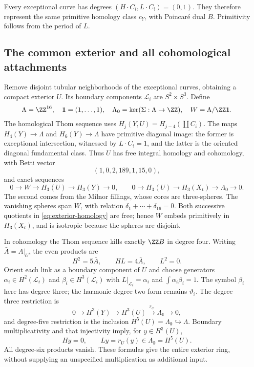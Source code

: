 Every exceptional curve has degrees $(H\cdot C_i,L\cdot C_i)=(0,1)$.
They therefore represent the same primitive homology class $c_Y$, with
Poincar\'e dual $B$. Primitivity follows from the period of $L$.

\subsection{The common exterior and all cohomological attachments}
Remove disjoint tubular neighborhoods of the exceptional curves, obtaining
a compact exterior $U$. Its boundary components $\mathcal L_i$ are
$S^2\times S^3$. Define
\[
 \Lambda=\ZZ^{16},\quad \mathbf1=(1,\ldots,1),\quad
 \Lambda_0=\ker(\Sigma:\Lambda\to\ZZ),\quad W=\Lambda/\ZZ\mathbf1.
\]
The homological Thom sequence uses
$H_j(Y,U)=H_{j-4}(\coprod C_i)$.
The maps $H_4(Y)\to\Lambda$ and $H_6(Y)\to\Lambda$ have primitive
diagonal image: the former is exceptional intersection, witnessed by
$L\cdot C_i=1$, and the latter is the oriented diagonal fundamental
class. Thus $U$ has free integral homology and cohomology, with Betti
vector
\begin{equation}\label{eq:exterior-betti}
 (1,0,2,189,1,15,0),
\end{equation}
and exact sequences
\begin{equation}\label{eq:exterior-homology}
 0\to W\to H_3(U)\to H_3(Y)\to0,
 \qquad 0\to H_3(U)\to H_3(X_t)\to \Lambda_0\to0.
\end{equation}
The second comes from the Milnor fillings, whose cores are three-spheres.
The vanishing spheres span $W$, with relation
$\delta_1+\cdots+\delta_{16}=0$. Both successive quotients in
\eqref{eq:exterior-homology} are free; hence $W$ embeds primitively in
$H_3(X_t)$, and is isotropic because the spheres are disjoint.

In cohomology the Thom sequence kills exactly $\ZZ B$ in degree four.
Writing $\bar A=A|_U$, the even products are
\[
 H^2=5\bar A,\qquad HL=4\bar A,\qquad L^2=0.
\]
Orient each link as a boundary component of $U$ and choose generators
$\alpha_i\in H^2(\mathcal L_i)$ and $\beta_i\in H^3(\mathcal L_i)$
with $L|_{\mathcal L_i}=\alpha_i$ and $\int\alpha_i\beta_i=1$.
The symbol $\beta_i$ here has degree three; the harmonic degree-two
form remains $\vartheta_i$. The degree-three restriction is
\begin{equation}\label{eq:exterior-cohomology}
 0\to H^3(Y)\to H^3(U)\xrightarrow{r_U}\Lambda_0\to0,
\end{equation}
and degree-five restriction is the inclusion $H^5(U)=\Lambda_0\hookrightarrow\Lambda$.
Boundary multiplicativity and that injectivity imply, for $y\in H^3(U)$,
\[
 Hy=0,\qquad Ly=r_U(y)\in \Lambda_0=H^5(U).
\]
All degree-six products vanish. These formulas give the entire exterior
ring, without supplying an unspecified multiplication as additional input.

